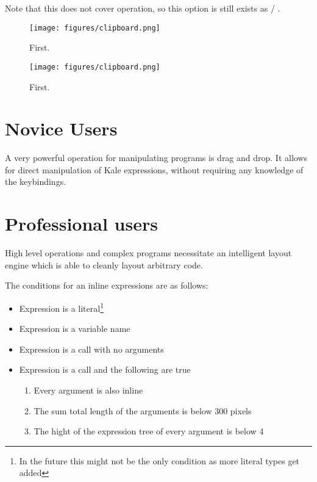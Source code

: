\documentclass[11pt]{report}
\begin{document}
Note that this does not cover  operation, so this option is
still exists as
  /  .

\begin{figure}
	\begin{minipage}{0.5\linewidth}
	\centering
	\texttt{[image: figures/clipboard.png]}
	\caption{First.}
	\end{minipage}
	\qquad
	\begin{minipage}{0.5\linewidth}
	\centering
	\texttt{[image: figures/clipboard.png]}
	\caption{First.}
	\end{minipage}
\end{figure}

\section{Novice Users}
A very powerful operation for manipulating programs is drag and drop. It allows
for direct manipulation of Kale expressions, without requiring any knowledge of
the keybindings.

\section{Professional users}


High level operations and complex programs necessitate an intelligent layout
engine which is able to cleanly layout arbitrary code.

The conditions for an inline expressions are as follows:

\begin{itemize}[noitemsep]
	\item Expression is a literal\footnote{In the future this might not be the
only condition as more literal types get added}
	\item Expression is a variable name
	\item Expression is a call with no arguments
	\item Expression is a call and the following are true
	\begin{enumerate}[noitemsep]
		\item Every argument is also inline
		\item The sum total length of the arguments is below 300 pixels
		\item The hight of the expression tree of every argument is below 4
	\end{enumerate}
\end{itemize}
\end{document}
